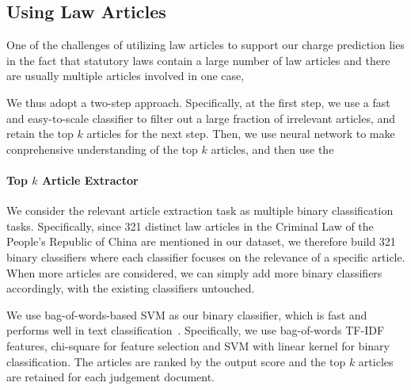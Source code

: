 \subsection{Using Law Articles} 
One of the challenges of utilizing law articles to support our charge prediction lies in the fact that statutory laws contain a large number of law articles and there are usually multiple articles involved in one case,  %

We thus adopt a two-step approach.%
Specifically, at the first step, we use a fast and easy-to-scale classifier to filter out a large fraction of irrelevant articles, and retain the top $k$ articles for the next step. Then, we use neural network to make conprehensive understanding of the top $k$ articles, and then use the 

\paragraph{Top $k$ Article Extractor}
\label{sec_article_extractor}
We consider the relevant article extraction task as multiple binary classification tasks. Specifically, since 321 distinct law articles in the Criminal Law of the People's Republic of China are mentioned in our dataset, we therefore build 321 binary classifiers where each classifier focuses on the relevance of a specific article. When more articles are considered,
we can simply add more binary classifiers accordingly, with the existing classifiers untouched.

We use bag-of-words-based SVM as our binary classifier, which is fast and performs well in text classification~\cite{joachims2002learning,wang2012baselines}. Specifically, we use bag-of-words TF-IDF features, chi-square for feature selection and SVM with linear kernel for binary classification. The articles are ranked by the output score and the top $k$ articles are retained for each judgement document.


